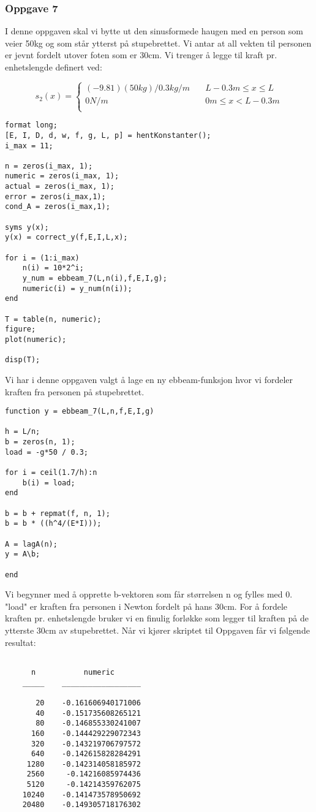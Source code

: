 \subsubsection{Oppgave 7}
I denne oppgaven skal vi bytte ut den sinusformede haugen med en person som veier 50kg og som står ytterst på stupebrettet. Vi antar at all vekten til personen er jevnt fordelt utover foten som er 30cm. Vi trenger å legge til kraft pr. enhetslengde definert ved: 

\[ s_{2}(x) =
  \begin{cases}
    (-9.81)(50kg)/0.3kg/m       & \quad L - 0.3m \leq x \leq L\\
    0N/m  & \quad 0m \leq x < L - 0.3m\\
  \end{cases}
\]

\begin{lstlisting}
format long;
[E, I, D, d, w, f, g, L, p] = hentKonstanter();
i_max = 11;

n = zeros(i_max, 1);
numeric = zeros(i_max, 1);
actual = zeros(i_max, 1);
error = zeros(i_max,1);
cond_A = zeros(i_max,1);

syms y(x);
y(x) = correct_y(f,E,I,L,x);

for i = (1:i_max)
    n(i) = 10*2^i;
    y_num = ebbeam_7(L,n(i),f,E,I,g);
    numeric(i) = y_num(n(i));
end

T = table(n, numeric);
figure;
plot(numeric);

disp(T);
\end{lstlisting}
Vi har i denne oppgaven valgt å lage en ny ebbeam-funksjon hvor vi fordeler kraften fra personen på stupebrettet.
\begin{lstlisting}
function y = ebbeam_7(L,n,f,E,I,g)

h = L/n;
b = zeros(n, 1);
load = -g*50 / 0.3;

for i = ceil(1.7/h):n
    b(i) = load;
end

b = b + repmat(f, n, 1);
b = b * ((h^4/(E*I)));

A = lagA(n);
y = A\b;

end
\end{lstlisting}
Vi begynner med å opprette b-vektoren som får størrelsen n og fylles med 0. "load" er kraften fra personen i Newton fordelt på hans 30cm. For å fordele kraften pr. enhetslengde bruker vi en finulig forløkke som legger til kraften på de ytterste 30cm av stupebrettet. Når vi kjører skriptet til Oppgaven får vi følgende resultat:
\begin{lstlisting}

      n           numeric      
    _____    __________________

       20    -0.161606940171006
       40    -0.151735608265121
       80    -0.146855330241007
      160    -0.144429229072343
      320    -0.143219706797572
      640    -0.142615828284291
     1280    -0.142314058185972
     2560     -0.14216085974436
     5120     -0.14214359762075
    10240    -0.141473578950692
    20480    -0.149305718176302
\end{lstlisting}
